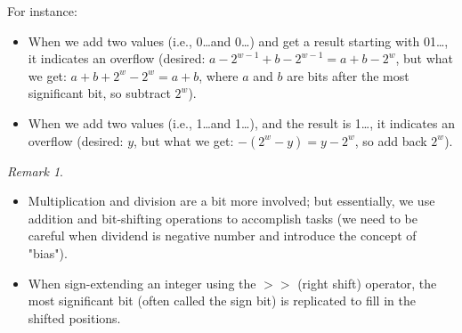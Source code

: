 \documentclass[11pt,reqno]{amsart}
\theoremstyle{remark}
\newtheorem{remark}[example]{Remark}
\begin{document}
For instance:
\begin{itemize}
    \item When we add two values (i.e., 0\ldots and 0\ldots) and get a result starting with 01\ldots, it indicates an overflow (desired: $a-2^{w-1}+b-2^{w-1}=a+b-2^w$, but what we get: $a+b+2^w-2^w=a+b$, where $a$ and $b$ are bits after the most significant bit, so subtract $2^w$).
    \item When we add two values (i.e., 1\ldots and 1\ldots), and the result is 1\ldots, it indicates an overflow (desired: $y$, but what we get: $-(2^w-y)=y-2^w$, so add back $2^w$).
\end{itemize}
\begin{remark}
\begin{itemize}
\item Multiplication and division are a bit more involved; but essentially, we use addition and bit-shifting operations to accomplish tasks (we need to be careful when dividend is negative number and introduce the concept of "bias"). 
\item When sign-extending an integer using the $>>$ (right shift) operator, the most significant bit (often called the sign bit) is replicated to fill in the shifted positions.
\end{itemize}
\end{remark}
\end{document}
